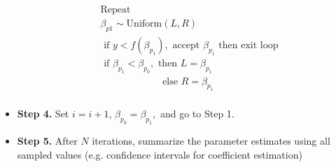 \documentclass[a4paper, 12pt]{article}
\begin{document}
\begin{itemize}
	\begin{equation*}
	\begin{aligned}
	&\mbox{Repeat}\\
	&\beta_{p1} \sim \mbox{Uniform}(L, R)\\
	&\mbox{ if } y < f(\beta_{p_1}), \mbox{ accept } \beta_{p_1} \mbox{ then exit loop}\\
	& \mbox{ if } \beta_{p_1} < \beta_{p_0} , \mbox{ then } L = \beta_{p_1}\\
	&\quad\quad\quad\quad\quad\quad\mbox{  else } R = \beta_{p_1}\\
	\end{aligned}
	\end{equation*}
\item[] {\textbf{Step 4.}} Set $i = i + 1$, $\beta_{p_0} = \beta_{p_1},$ and go to Step 1.
	\item[] {\textbf{Step 5.}} After $N$ iterations, summarize the parameter estimates using all sampled values (e.g. confidence intervals for coefficient estimation)
\end{itemize}
\end{document}
